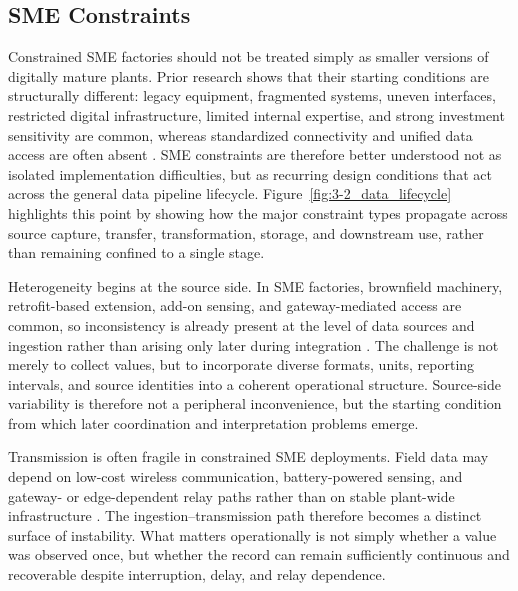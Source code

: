 \documentclass[systems,article,submit,pdftex,moreauthors]{Definitions/mdpi}
\begin{document}
\subsection{SME Constraints}
\label{sec:sme_constraints}


Constrained SME factories should not be treated simply as smaller versions of digitally mature plants. Prior research shows that their starting conditions are structurally different: legacy equipment, fragmented systems, uneven interfaces, restricted digital infrastructure, limited internal expertise, and strong investment sensitivity are common, whereas standardized connectivity and unified data access are often absent \cite{mittal2018maturity, mittal2020adoption, ghobakhloo2019adoption, krishnan2024challenges, rauch2019requirements}. SME constraints are therefore better understood not as isolated implementation difficulties, but as recurring design conditions that act across the general data pipeline lifecycle. Figure~\ref{fig:3-2_data_lifecycle} highlights this point by showing how the major constraint types propagate across source capture, transfer, transformation, storage, and downstream use, rather than remaining confined to a single stage.

Heterogeneity begins at the source side. In SME factories, brownfield machinery, retrofit-based extension, add-on sensing, and gateway-mediated access are common, so inconsistency is already present at the level of data sources and ingestion rather than arising only later during integration \cite{alqoud2022legacy, etz2020retrofit, tran2022retrofitting, park2019opcua}. The challenge is not merely to collect values, but to incorporate diverse formats, units, reporting intervals, and source identities into a coherent operational structure. Source-side variability is therefore not a peripheral inconvenience, but the starting condition from which later coordination and interpretation problems emerge.

Transmission is often fragile in constrained SME deployments. Field data may depend on low-cost wireless communication, battery-powered sensing, and gateway- or edge-dependent relay paths rather than on stable plant-wide infrastructure \cite{gao2019connectivity, noor2023wireless, hawkridge2019tying}. The ingestion--transmission path therefore becomes a distinct surface of instability. What matters operationally is not simply whether a value was observed once, but whether the record can remain sufficiently continuous and recoverable despite interruption, delay, and relay dependence.
\end{document}

